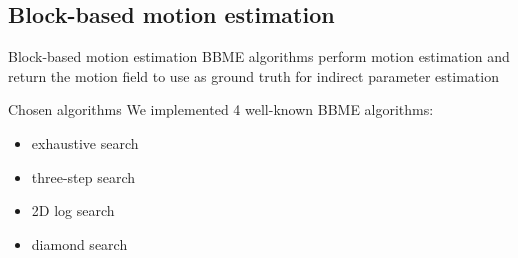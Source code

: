 \documentclass[aspectratio=1610,xcolor=dvipsnames]{beamer}
\begin{document}
\subsection{Block-based motion estimation}
\begin{frame}{Block-based motion estimation}
	BBME algorithms perform motion estimation and return the motion field to use as ground truth for indirect parameter estimation

	\bigskip	
    \begin{exampleblock}{Chosen algorithms}
        We implemented 4 well-known BBME algorithms:
        \begin{itemize}
            \item exhaustive search
            \item three-step search
            \item 2D log search
            \item diamond search
        \end{itemize}        
    \end{exampleblock}
\end{frame}
\end{document}
